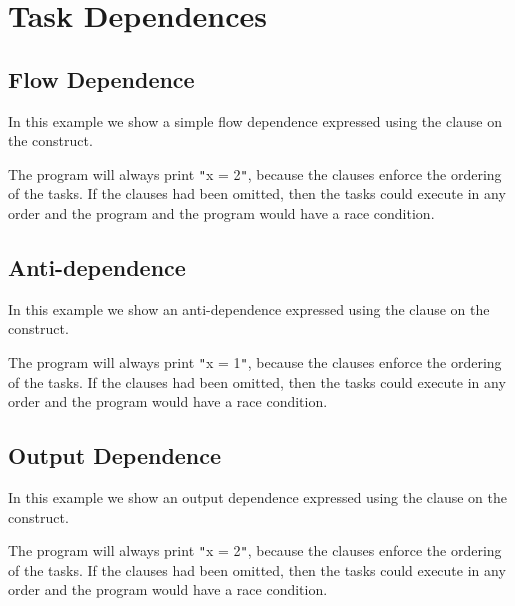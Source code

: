\pagebreak
\chapter{Task Dependences}
\label{chap:task_dep}

\section{Flow Dependence}

In this example we show a simple flow dependence expressed using the  
clause on the  construct.



The program will always print \texttt{"}x = 2\texttt{"}, because the  
clauses enforce the ordering of the tasks. If the  clauses had been 
omitted, then the tasks could execute in any order and the program and the program 
would have a race condition.

\section{Anti-dependence}

In this example we show an anti-dependence expressed using the  
clause on the  construct.



The program will always print \texttt{"}x = 1\texttt{"}, because the  
clauses enforce the ordering of the tasks. If the  clauses had been 
omitted, then the tasks could execute in any order and the program would have a 
race condition.

\section{Output Dependence}

In this example we show an output dependence expressed using the  
clause on the  construct.



The program will always print \texttt{"}x = 2\texttt{"}, because the  
clauses enforce the ordering of the tasks. If the  clauses had been 
omitted, then the tasks could execute in any order and the program would have a 
race condition.

